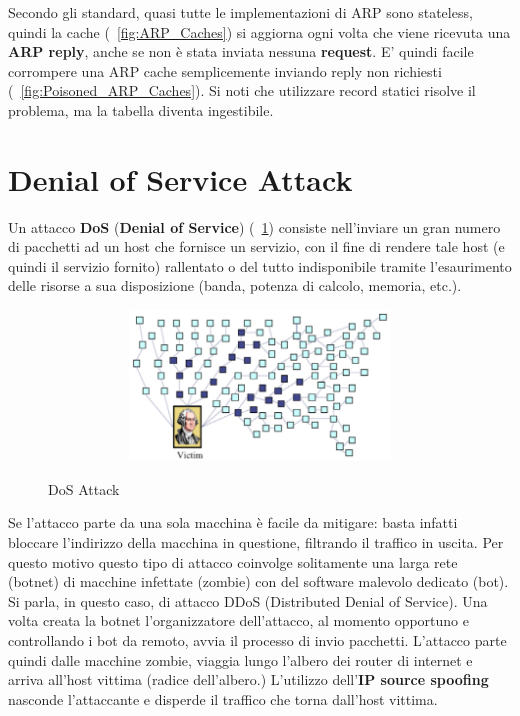 Secondo gli standard, quasi tutte le implementazioni di ARP sono stateless, quindi la cache (\figurename~\ref{fig:ARP_Caches}) si aggiorna ogni volta che viene ricevuta una \textbf{ARP reply}, anche se non è stata inviata nessuna \textbf{request}. E' quindi facile corrompere una ARP cache semplicemente inviando reply non richiesti (\figurename~\ref{fig:Poisoned_ARP_Caches}). Si noti che utilizzare record statici risolve il problema, ma la tabella diventa ingestibile.

\section{Denial of Service Attack}
Un attacco \textbf{DoS} (\textbf{Denial of Service}) (\figurename~\ref{fig:DoS_Attack}) consiste nell'inviare un gran numero di pacchetti ad un host che fornisce un servizio, con il fine di rendere tale host (e quindi il servizio fornito) rallentato o del tutto indisponibile tramite l'esaurimento delle risorse a sua disposizione (banda, potenza di calcolo, memoria, etc.).
\begin{figure}[htbp]
	\centering%
	\subfigure%
	{\includegraphics[height=4cm, width=12cm, keepaspectratio]{Immagini/reti/DoS_Attack.png}}
	\caption{DoS Attack\label{fig:DoS_Attack}} 	
\end{figure}
Se l'attacco parte da una sola macchina è facile da mitigare: basta infatti bloccare l'indirizzo della macchina in questione, filtrando il traffico in uscita. Per questo motivo questo tipo di attacco coinvolge solitamente una larga rete (botnet) di macchine infettate (zombie) con del software malevolo dedicato (bot). Si parla, in questo caso, di attacco DDoS (Distributed Denial of Service). Una volta creata la botnet l'organizzatore dell'attacco, al momento opportuno e controllando i bot da remoto, avvia il processo di invio pacchetti.
\newline \newline
L'attacco parte quindi dalle macchine zombie, viaggia lungo l'albero dei router di internet e arriva all'host vittima (radice dell'albero.) L'utilizzo dell'\textbf{IP source spoofing} nasconde l'attaccante e disperde il traffico che torna dall'host vittima.
\newline \newline
